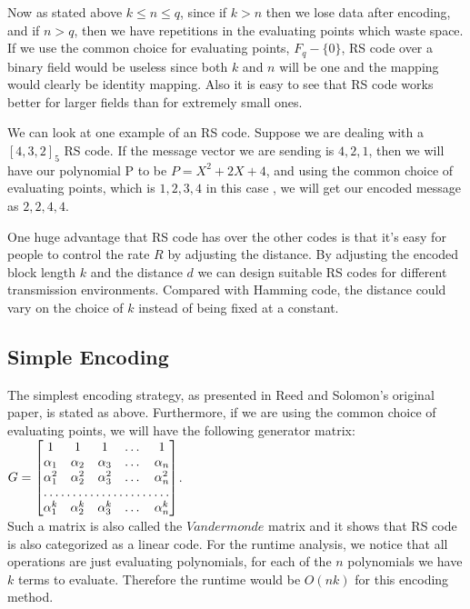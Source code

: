 \documentclass{article}
\begin{document}
Now as stated above $k \le n \le q$, since if $k >n$ then we lose data after encoding, and if $n > q$, then we have repetitions in the evaluating points which waste space. If we use the common choice for evaluating points, $F_q - \{0\}$, RS code over a binary field would be useless since both $k$ and $n$ will be one and the  mapping would clearly be identity mapping. Also it is easy to see that RS code works better for larger fields than for extremely small ones.

We can look at one example of an RS code. Suppose we are dealing with a $[4,3,2]_5$ RS code. If the message vector we are sending is ${4, 2, 1}$, then we will have our polynomial P to be $P = X^2 + 2X + 4$, and using the common choice of evaluating points, which is ${1,2,3,4}$ in this case , we will get our encoded message as ${2, 2, 4,4}$.

One huge advantage that RS code has over the other codes is that it's easy for people to control the rate $R$ by adjusting the distance. By adjusting the encoded block length $k$ and the distance $d$ we can design suitable RS codes for different transmission environments. Compared with Hamming code, the distance could vary on the choice of $k$ instead of being fixed at a constant.
\subsection{Simple Encoding}
The simplest encoding strategy, as presented in Reed and Solomon's original paper, is stated as above. Furthermore, if we are using the common choice of evaluating points, we will have the following generator matrix:\\

$G = \begin{bmatrix}
	1 & 1 & 1 &\dots & 1 \\
	\alpha_1 & \alpha_2 & \alpha_3 & \dots & \alpha_n \\
	\alpha_1^2 & \alpha_2^2 & \alpha_3^2 & \dots & \alpha_n^2  \\
	\hdotsfor{5} \\
	\alpha_1^k & \alpha_2^k & \alpha_3^k & \dots & \alpha_n^k \\
    \end{bmatrix}$.\\

\noindent Such a matrix is also called the $Vandermonde$ matrix and it shows that RS code is also categorized as a linear code. For the runtime analysis, we notice that all operations are just evaluating polynomials, for each of the $n$ polynomials we have $k$ terms to evaluate. Therefore the runtime would be $O(nk)$ for this encoding method.
\end{document}
